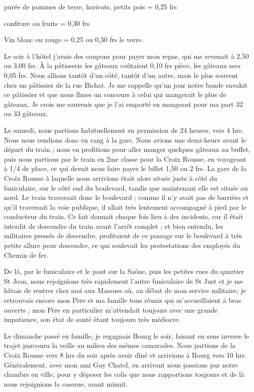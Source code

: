 \documentclass[11pt,a4paper]{report}
\begin{document}
purée de pommes de terre, haricots, petits pois = 0,25 frs

confiture ou fruits = 0,30 frs

Vin blanc ou rouge = 0,25 ou 0,30 frs le verre.

Le soir à l'hôtel j'avais des coupons pour payer mon repas, qui me revenait à 2,50 ou 3,00 frs. À la pâtisserie les gâteaux coûtaient 0,10 frs pièce, les gâteaux secs 0,05 frs. Nous allions tantôt d'un côté, tantôt d'un autre, mais le plus souvent chez un pâtissier de la rue Bichat. Je me rappelle qu'un jour notre bande envahit ce pâtissier et que nous fîmes un concours à celui qui mangerait le plus de gâteaux. Je crois me souvenir que je l'ai emporté en mangeant pour ma part 32 ou 33 gâteaux.

Le samedi, nous partions habituellement en permission de 24 heures, vers 4 hrs. Nous nous rendions donc en rang à la gare. Nous avions une demi-heure avant le départ du train ; nous en profitions pour aller manger quelques gâteaux au buffet, puis nous partions par le train en 2me classe pour la Croix Rousse, en voyageant à 1/4 de place, ce qui devait nous faire payer le billet 1,50 ou 2 frs. La gare de la Croix Rousse à laquelle nous arrivions était alors située juste à côté du funiculaire, sur le côté sud du boulevard, tandis que maintenant elle est située au nord. Le train traversait donc le boulevard ; comme il n'y avait pas de barrière et qu'il traversait la voie publique, il allait très lentement accompagné à pied par le conducteur du train. Ce fait donnait chaque fois lieu à des incidents, car il était interdit de descendre du train avant l'arrêt complet ; et bien entendu, les militaires pressés de descendre, profitaient de ce passage sur le boulevard à très petite allure pour descendre, ce qui soulevait les protestations des employés du Chemin de fer.

De là, par le funiculaire et le pont sur la Saône, puis les petites rues du quartier St Jean, nous rejoignions très rapidement l'autre funiculaire de St Just et je me hâtais de rentrer chez moi aux Massues où, au début de mon service militaire, je retrouvais encore mon Père et ma famille tous réunis qui m'accueillaient à bras ouverts ; mon Père en particulier m'attendait toujours avec une grande impatience, son état de santé étant toujours très médiocre.

Le dimanche passé en famille, je regagnais Bourg le soir, faisant en sens inverse le trajet parcouru la veille au milieu des mêmes camarades. Nous partions de la Croix Rousse vers 8 hrs du soir après avoir dîné et arrivions à Bourg vers 10 hrs. Généralement, avec mon ami Guy Chatel, en arrivant nous passions par notre chambre en ville, pour y déposer les colis que nous rapportions toujours et de là nous rejoignions la caserne, avant minuit.
\end{document}
